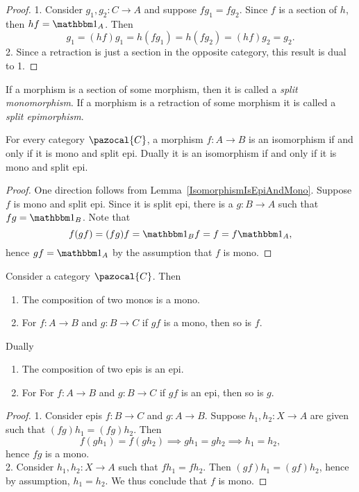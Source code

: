 \begin{proof}
    1. Consider $g_1,g_2: C\rightarrow A$ and suppose $fg_1 = f g_2$. Since $f$ is a section of $h$, then $hf = \fone_A$. Then 
    $$
        g_1 = (hf)g_1 = h(fg_1) = h (fg_2)= (hf)g_2 = g_2.
    $$
    2. Since a retraction is just a section in the opposite category, this result is dual to 1.
\end{proof}
\begin{remark}
    If a morphism is a section of some morphism, then it is called a \emph{split monomorphism}. If a morphism is a retraction of some morphism it is called a \emph{split epimorphism}.
\end{remark}
\begin{lemma}
    For every category $\pazocal{C}$, a morphism $f : A\rightarrow B$ is an isomorphism if and only if it is mono and split epi. Dually it is an isomorphism if and only if it is mono and split epi.
\end{lemma}
\begin{proof}
    One direction follows from Lemma~\ref{IsomorphismIsEpiAndMono}. Suppose $f$ is mono and split epi. Since it is split epi, there is a $g:B\rightarrow A$ such that $fg = \fone_B$. Note that 
    $$f(gf)=(fg)f=\fone_B f= f = f\fone_A,$$
    hence $gf = \fone_A$ by the assumption that $f$ is mono.
\end{proof}
\begin{lemma}
    Consider a category $\pazocal{C}$. Then 
    \begin{enumerate}
        \item The composition of two monos is a mono.
        \item For $f:A\rightarrow B$ and $g : B\rightarrow C$ if $gf$ is a mono, then so is $f$. 
    \end{enumerate}
    Dually 
    \begin{enumerate}
        \item The composition of two epis is an epi.
        \item For For $f:A\rightarrow B$ and $g : B\rightarrow C$ if $gf$ is an epi, then so is $g$.
    \end{enumerate}
\end{lemma}
\begin{proof}
    1. Consider epis $f: B\rightarrow C$ and $g:A\rightarrow B$. Suppose $h_1,h_2 : X\rightarrow A$ are given such that $(fg)h_1 = (fg)h_2$. Then 
    $$f(gh_1)=f(gh_2)\implies gh_1 = gh_2 \implies h_1 =h_2,$$
    hence $fg$ is a mono.\\
    2. Consider $h_1,h_2 : X \rightarrow A$ such that $fh_1 = fh_2$. Then $(gf)h_1 = (gf)h_2$, hence by assumption, $h_1 = h_2$. We thus conclude that $f$ is mono.
\end{proof}
